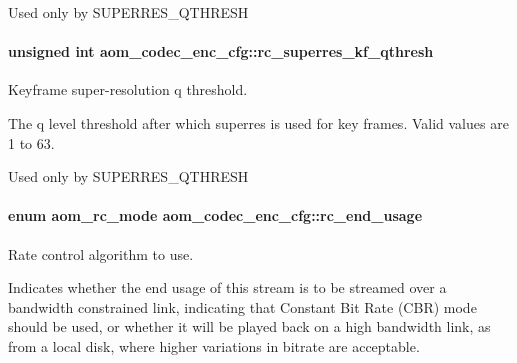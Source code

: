 Used only by S\+U\+P\+E\+R\+R\+E\+S\+\_\+\+Q\+T\+H\+R\+E\+SH 
\paragraph[{\texorpdfstring{rc\+\_\+superres\+\_\+kf\+\_\+qthresh}{rc_superres_kf_qthresh}}]{\setlength{\rightskip}{0pt plus 5cm}unsigned int aom\+\_\+codec\+\_\+enc\+\_\+cfg\+::rc\+\_\+superres\+\_\+kf\+\_\+qthresh}\hypertarget{structaom__codec__enc__cfg_adf982eaa83e7bbdeb40f56bfd307cc98}{}\label{structaom__codec__enc__cfg_adf982eaa83e7bbdeb40f56bfd307cc98}


Keyframe super-\/resolution q threshold. 

The q level threshold after which superres is used for key frames. Valid values are 1 to 63.

Used only by S\+U\+P\+E\+R\+R\+E\+S\+\_\+\+Q\+T\+H\+R\+E\+SH 
\paragraph[{\texorpdfstring{rc\+\_\+end\+\_\+usage}{rc_end_usage}}]{\setlength{\rightskip}{0pt plus 5cm}enum {\bf aom\+\_\+rc\+\_\+mode} aom\+\_\+codec\+\_\+enc\+\_\+cfg\+::rc\+\_\+end\+\_\+usage}\hypertarget{structaom__codec__enc__cfg_a3fd74d888658039d09bc4eacf163a495}{}\label{structaom__codec__enc__cfg_a3fd74d888658039d09bc4eacf163a495}


Rate control algorithm to use. 

Indicates whether the end usage of this stream is to be streamed over a bandwidth constrained link, indicating that Constant Bit Rate (C\+BR) mode should be used, or whether it will be played back on a high bandwidth link, as from a local disk, where higher variations in bitrate are acceptable. 
